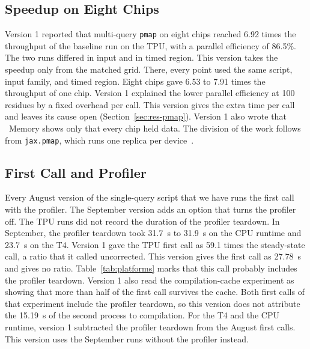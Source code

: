 \subsection*{Speedup on Eight Chips}
Version 1 reported that multi-query \texttt{pmap} on eight chips reached 6.92 times the throughput of the baseline run on the TPU, with a parallel efficiency of 86.5\%. %
The two runs differed in input and in timed region. This version takes the speedup only from the matched grid. There,
every point used the same script, input family, and timed region.
Eight chips gave 6.53 to 7.91 times the throughput of one chip. %
Version 1 explained the lower parallel efficiency at 100 residues by a fixed overhead per call. This version gives the extra time per call and leaves its cause open (Section~\ref{sec:res-pmap}). %
Version 1 also wrote that \ Memory shows
only that every chip held data. The division of the work follows from \texttt{jax.pmap}, which runs one replica per
device~\cite{jaxpmap}.

\subsection*{First Call and Profiler}
Every August version of the single-query script that we have runs the first call with the profiler. The September
version adds an option that turns the profiler off. The TPU runs did not record the duration of the profiler teardown.
In September, the profiler teardown took 31.7~s to 31.9~s on the CPU runtime and 23.7~s on the T4. %
Version 1 gave the TPU first call as 59.1 times the steady-state call, a ratio that it called uncorrected. %
This version gives the first call as 27.78~s and gives no ratio. %
Table~\ref{tab:platforms} marks that this call probably includes the profiler teardown.
Version 1 also read the compilation-cache experiment as showing that more than half of the first call survives the
cache. Both first calls of that experiment include the profiler teardown, so this version does not attribute the 15.19~s of the second process to compilation. %
For the T4 and the CPU runtime, version 1 subtracted the profiler teardown from the August first calls. This version
uses the September runs without the profiler instead.

